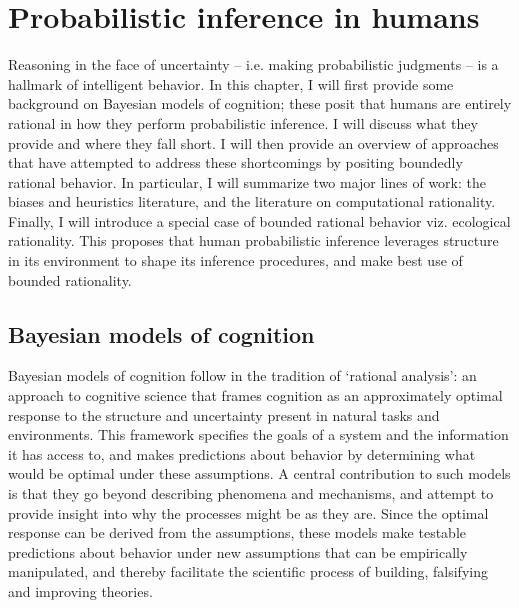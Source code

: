 

\chapter{Probabilistic inference in humans}
\label{chap:psych}

Reasoning in the face of uncertainty -- i.e. making probabilistic judgments -- is a hallmark of intelligent behavior. In this chapter, I will first provide some background on Bayesian models of cognition; these posit that humans are entirely rational in how they perform probabilistic inference. I will discuss what they provide and where they fall short. I will then provide an overview of approaches that have attempted to address these shortcomings by positing boundedly rational behavior. In particular, I will summarize two major lines of work: the biases and heuristics literature, and the literature on computational rationality. Finally, I will introduce a special case of bounded rational behavior viz. ecological rationality. This proposes that human probabilistic inference leverages structure in its environment to shape its inference procedures, and make best use of bounded rationality.

\section{Bayesian models of cognition}
Bayesian models of cognition follow in the tradition of `rational analysis'\cite{shepard1987toward, anderson1990adaptive}: an approach to cognitive science that frames cognition as an approximately optimal response to the structure and uncertainty present in natural tasks and environments. This framework specifies the goals of a system and the information it has access to, and makes predictions about behavior by determining what would be optimal under these assumptions. A central contribution to such models is that they go beyond describing phenomena and mechanisms, and attempt to provide insight into why the processes might be as they are. Since the optimal response can be derived from the assumptions, these models make testable predictions about behavior under new assumptions that can be empirically manipulated, and thereby facilitate the scientific process of building, falsifying and improving theories.

